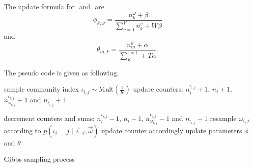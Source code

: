 \documentclass[paper=a4, fontsize=11pt]{scrartcl}
\begin{document}
The update formula for $ $ and $ $ are
\begin{equation}
\phi_{k,\omega} = \frac{n^{\omega}_{k}+\beta}{\sum_{v=1}^{V}n^{v}_{k}+W\beta}
\end{equation}
and
\begin{equation}
\theta_{m,k} = \frac{n^{k}_{m}+\alpha}{\sum_{K}^{\iota=1}+T\alpha}.
\end{equation}

The pseudo code is given as following.
\begin{algorithm}
\begin{algorithmic}[1]
\State sample community index $ \iota_{i,j} \sim \mbox{Mult}(\frac{1}{K}) $
\State update counters: $ n^{\iota_{i,j}}_{i} + 1 $, $ n_{i} + 1 $, $ n^{\iota_{i,j}}_{\omega_{i,j}} +1 $ and $ n_{\iota_{i,j}} +1 $
\EndFor
\EndFor

\State decrement counters and sums:  $ n^{\iota_{i,j}}_{i} - 1 $, $ n_{i} - 1 $, $ n^{\iota_{i,j}}_{\omega_{i,j}} - 1 $ and $ n_{\iota_{i,j}} - 1 $ 
\State resample $ \omega_{i,j} $ according to  $ p(\iota_{i}=j \mid \vec{\iota}_{\neg i}, \vec{\omega} ) $
\State update counter accordingly
\EndFor
\EndFor
{}
\State update parameters $ \phi $ and $ \theta $
\EndIf
\EndWhile
\end{algorithmic}
\caption{Gibbs sampling process}
\end{algorithm}





\end{document}
